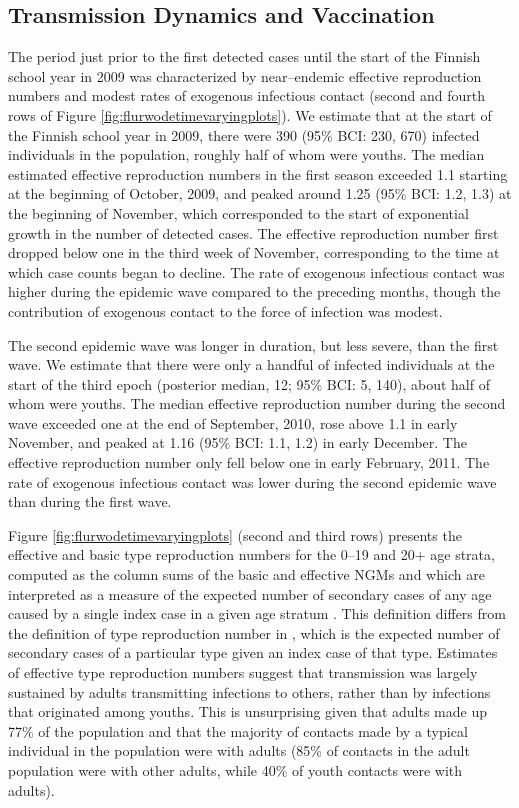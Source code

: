 \subsection{Transmission Dynamics and Vaccination}
\label{flu_res_dynamics}

The period just prior to the first detected cases until the start of the Finnish school year in 2009 was characterized by near--endemic effective reproduction numbers and modest rates of exogenous infectious contact (second and fourth rows of Figure \ref{fig:flurwodetimevaryingplots}). We estimate that at the start of the Finnish school year in 2009, there were 390 (95\% BCI: 230, 670) infected individuals in the population, roughly half of whom were youths. The median estimated effective reproduction numbers in the first season exceeded 1.1 starting at the beginning of October, 2009, and peaked around 1.25 (95\% BCI: 1.2, 1.3) at the beginning of November, which corresponded to the start of exponential growth in the number of detected cases. The effective reproduction number first dropped below one in the third week of November, corresponding to the time at which case counts began to decline. The rate of exogenous infectious contact was higher during the epidemic wave compared to the preceding months, though the contribution of exogenous contact to the force of infection was modest. 

The second epidemic wave was longer in duration, but less severe, than the first wave. We estimate that there were only a handful of infected individuals at the start of the third epoch (posterior median, 12; 95\% BCI: 5, 140), about half of whom were youths. The median effective reproduction number during the second wave exceeded one at the end of September, 2010, rose above 1.1 in early November, and peaked at 1.16 (95\% BCI: 1.1, 1.2) in early December. The effective reproduction number only fell below one in early February, 2011. The rate of exogenous infectious contact was lower during the second epidemic wave than during the first wave. 
 
Figure \ref{fig:flurwodetimevaryingplots} (second and third rows) presents the effective and basic type reproduction numbers for the 0--19 and 20+ age strata, computed as the column sums of the basic and effective NGMs and which are interpreted as a measure of the expected number of secondary cases of any age caused by a single index case in a given age stratum \cite{glass2011estimating}. This definition differs from the definition of type reproduction number in \cite{heesterbeek2007type}, which is the expected number of secondary cases of a particular type given an index case of that type. Estimates of effective type reproduction numbers suggest that transmission was largely sustained by adults transmitting infections to others, rather than by infections that originated among youths. This is unsurprising given that adults made up 77\% of the population and that the majority of contacts made by a typical individual in the population were with adults (85\% of contacts in the adult population were with other adults, while 40\% of youth contacts were with adults). 

